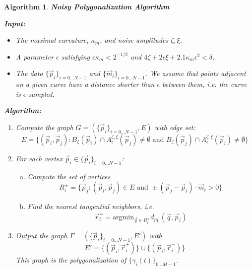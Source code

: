\documentclass{article}
\newtheorem{algo}{Algorithm}
\numberwithin{cntr}{section}
\numberwithin{equation}{section}
\newcommand{\vp}[0]{{\vec{p}}}
\newcommand{\vq}[0]{{\vec{q}}}
\newcommand{\vr}[0]{{\vec{r}}}
\newcommand{\vm}[0]{{\vec{m}}}
\newcommand{\Oto}[1]{{0 \ldots #1-1}}
\newcommand{\OtoN}{{0 \ldots N-1}}
\newcommand{\pointData}{{ \{ \vp_{i} \}_{i=\OtoN} }}
\newcommand{\tanData}{{ \{ \vm_{i} \}_{i=\OtoN} }}
\newcommand{\curveSet}{{ \{ \gamma_i(t) \}_{\Oto{M}}}}
\newcommand{\ball}[2]{ { B_{#1}(#2) } }
\newcommand{\curvemax}{{\kappa_{m}}}
\newcommand{\curvesep}{{\delta}}
\newcommand{\pointNoise}{{\zeta}}
\newcommand{\tanNoise}{{\xi}}
\newcommand{\nallowed}[2]{ { A^{\pointNoise, \tanNoise}_{#1}(#2) } }
\begin{document}
\begin{algo}
  \label{algo:polygonalizationNoisy}
  {\bf Noisy Polygonalization Algorithm }

  { \bf Input: }

  \begin{itemize}
  \item The maximal curvature, $\curvemax$, and noise amplitudes $\pointNoise, \tanNoise$.
  \item A parameter $\epsilon$ satisfying $\epsilon \curvemax < 2^{-1/2}$ and $4 \pointNoise + 2 \epsilon \tanNoise + 2.1 \curvemax \epsilon^{2} < \curvesep$.
  \item The data $\pointData$ and $\tanData$. We assume that points adjacent on a given curve have a distance shorter than $\epsilon$ between them, i.e. the curve is $\epsilon$-sampled.
  \end{itemize}


  {\bf Algorithm: }

  \begin{enumerate}
  \item Compute the graph $G = (\pointData, E)$ with edge set:
    \begin{equation}
      \label{eq:noisyConditionForCheckingIfEdgeConnectionIsPlausible}
      E = \{ (\vp_{i},\vp_{j}) : \ball{\pointNoise}{\vp_{i}} \cap \nallowed{\epsilon}{\vp_{j}} \neq \emptyset  \textrm{~and~} \ball{\pointNoise}{\vp_{j}} \cap \nallowed{\epsilon}{\vp_{i}} \neq \emptyset \}
    \end{equation}
  \item For each vertex $\vp_{i} \in \pointData$:
    \begin{enumerate}[a.]
    \item Compute the set of vertices
      \begin{equation*}
        R^{\pm}_{i} = \{ \vp_{j} : (\vp_{i}, \vp_{j}) \in E \textrm{~and~} \pm (\vp_{j}-\vp_{i}) \cdot \vm_{i} > 0 \}
      \end{equation*}
    \item Find the nearest tangential neighbors, i.e.
      \begin{equation*}
        \vr^{\pm}_{i} = \textrm{argmin}_{\vq \in R^{\pm}_{i}} d_{\vm_{i}}(\vq, \vp_{i})
      \end{equation*}
    \end{enumerate}
  \item Output the graph $\Gamma = ( \pointData, E')$ with
    \begin{equation*}
      E' = \{ (\vp_{i}, \vr^{+}_{i}) \} \cup \{ (\vp_{i}, \vr^{-}_{i}) \}
    \end{equation*}
    This graph is the polygonalization of $\curveSet$.
  \end{enumerate}

\end{algo}
\end{document}
